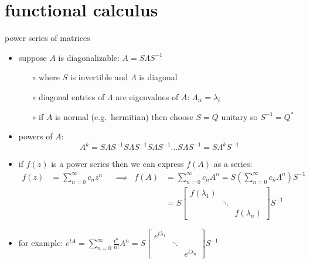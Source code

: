 \documentclass[10pt,hyperref]{beamer}
\begin{document}


\section{functional calculus}

\begin{frame}{power series of matrices}

\begin{itemize}
\item suppose $A$ is diagonalizable: $A = S \Lambda S^{-1}$
    \begin{itemize}
    \item[$\circ$] where $S$ is invertible and $\Lambda$ is diagonal
    \item[$\circ$] diagonal entries of $\Lambda$ are eigenvalues of $A$: $\Lambda_{ii} = \lambda_i$
    \item[$\circ$] if $A$ is normal (e.g.~hermitian) then choose $S=Q$ unitary so $S^{-1}=Q^*$
    \end{itemize}
\item powers of $A$:
    $$A^k = S \Lambda S^{-1} S \Lambda S^{-1} S \Lambda S^{-1} \dots S \Lambda S^{-1} = S \Lambda^k S^{-1}$$
\item if $f(z)$ is a power series then we can express $f(A)$ as a series:
\small
\begin{align*}
f(z) &= \sum_{n=0}^\infty c_n z^n & &\implies & f(A) &= \sum_{n=0}^\infty c_n A^n = S \left(\sum_{n=0}^\infty c_n \Lambda^n\right) S^{-1} \\
     &&&& &= S \begin{bmatrix} f(\lambda_1) & & \\ & \ddots & \\ & & f(\lambda_n) \end{bmatrix} S^{-1}
\end{align*}
\normalsize
\item for example: \qquad \small
$\displaystyle e^{tA} = \sum_{n=0}^\infty \frac{t^n}{n!} A^n =  S \begin{bmatrix} e^{t\lambda_1} & & \\ & \ddots & \\ & & e^{t\lambda_n} \end{bmatrix} S^{-1}$
\end{itemize}
\end{frame}
\end{document}
